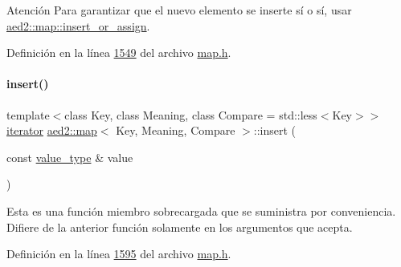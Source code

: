 \begin{DoxyAttention}{Atención}
Para garantizar que el nuevo elemento se inserte sí o sí, usar \hyperlink{classaed2_1_1map_a2ef6723c183916276b0afc4a4c721475_a2ef6723c183916276b0afc4a4c721475}{aed2\+::map\+::insert\+\_\+or\+\_\+assign}. 
\end{DoxyAttention}


Definición en la línea \hyperlink{map_8h_source_l01549}{1549} del archivo \hyperlink{map_8h_source}{map.\+h}.

\mbox{\label{classaed2_1_1map_a60aacba06b1579630b3c8e996cf248c8_a60aacba06b1579630b3c8e996cf248c8}} 
\paragraph{\texorpdfstring{insert()}{insert()}\hspace{0.1cm}{\footnotesize\ttfamily [2/2]}}
{\footnotesize\ttfamily template$<$class Key, class Meaning, class Compare = std\+::less$<$\+Key$>$$>$ \\
\hyperlink{classaed2_1_1map_1_1iterator}{iterator} \hyperlink{classaed2_1_1map}{aed2\+::map}$<$ Key, Meaning, Compare $>$\+::insert (\begin{DoxyParamCaption}\item[{const \hyperlink{classaed2_1_1map_a719db98e0ff9a837610f76be33264680_a719db98e0ff9a837610f76be33264680}{value\+\_\+type} \&}]{value }\end{DoxyParamCaption})\hspace{0.3cm}{\ttfamily [inline]}}

Esta es una función miembro sobrecargada que se suministra por conveniencia. Difiere de la anterior función solamente en los argumentos que acepta. 

Definición en la línea \hyperlink{map_8h_source_l01595}{1595} del archivo \hyperlink{map_8h_source}{map.\+h}.

\mbox{\label{classaed2_1_1map_aef47582a93a069c4ec95da8c595e4fee_aef47582a93a069c4ec95da8c595e4fee}} 
